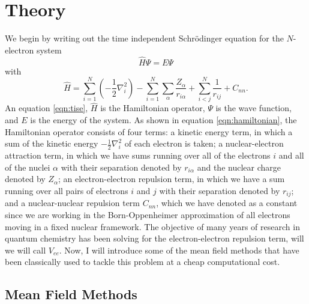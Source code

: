 \documentclass[12pt]{caltech_thesis}
\begin{document}
\chapter{Theory}
We begin by writing out the time independent Schrödinger equation for the $N$-electron system
\begin{equation}
    \hat{H}\Psi =E\Psi 
\label{eqn:tise}
\end{equation}
with
\begin{equation}
\hat{H}=\sum_{i=1}^N\left(-\frac{1}{2} \nabla_i^2\right)-\sum_{i=1}^N \sum_{\alpha }\frac{Z_{\alpha }}{r_{i\alpha }}+\sum_{i<j}^N \frac{1}{r_{i j}} + C_{nn}.
\label{eqn:hamiltonian}
\end{equation}
An equation \ref{eqn:tise}, $\hat{H}$ is the Hamiltonian operator, $\Psi$ is the wave function, and $E$ is the energy of the system. As shown in equation \ref{eqn:hamiltonian}, the Hamiltonian operator consists of four terms: a kinetic energy term, in which a sum of the kinetic energy $-\frac{1}{2} \nabla_i^2$ of each electron is taken; a nuclear-electron attraction term, in which we have sums running over all of the electrons $i$ and all of the nuclei $\alpha$ with their separation denoted by $r_{i\alpha}$ and the nuclear charge denoted by $Z_{\alpha}$; an electron-electron repulsion term, in which we have a sum running over all pairs of electrons $i$ and $j$ with their separation denoted by $r_{ij}$; and a nuclear-nuclear repulsion term $C_{nn}$, which we have denoted as a constant since we are working in the Born-Oppenheimer approximation of all electrons moving in a fixed nuclear framework.
 The objective of many years of research in quantum chemistry has been solving for the electron-electron repulsion term, will we will call $V_{ee}$.
Now, I will introduce some of the mean field methods that have been classically used to tackle this problem at a cheap computational cost.
\section{Mean Field Methods}
\end{document}
